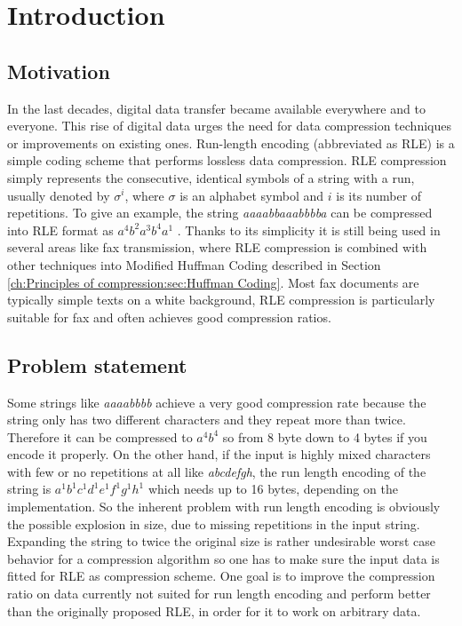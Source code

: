 
\chapter{Introduction}
\label{ch:Introduction}
\section{Motivation}
\label{ch:Introduction:sec:Motivation}
\par{
In the last decades, digital data transfer became available everywhere and to everyone. This rise of digital data urges the need for data compression techniques or improvements on existing ones. Run-length encoding \cite{rle-patent} (abbreviated as RLE) is a simple coding scheme that performs lossless data compression. RLE compression simply represents the consecutive, identical symbols of a string with a run, usually denoted by $\sigma^i$, where $\sigma$ is an alphabet symbol and $i$ is its number of repetitions. To give an example, the string \emph{aaaabbaaabbbba} can be compressed into RLE format as  $ a^{4}b^{2}a^{3}b^{4}a^{1}$ . Thanks to its simplicity it is still being used in several areas like fax transmission, where RLE compression is combined with other techniques into Modified Huffman Coding \cite{fax-rle} described in Section \ref{ch:Principles of compression:sec:Huffman Coding}. Most fax documents are typically simple texts on a white background, RLE compression is particularly suitable for fax and often achieves good compression ratios.
}
\section{Problem statement}
\label{ch:Introduction:sec:Problem statement}
\par{
Some strings like \emph{aaaabbbb} achieve a very good compression rate because the string only has two different characters and they repeat more than twice. Therefore it can be compressed to $a^4b^4$ so from 8 byte down to 4 bytes if you encode it properly. On the other hand, if the input is highly mixed characters with few or no repetitions at all like \emph{abcdefgh}, the run length encoding of the string is $a^1b^1c^1d^1e^1f^1g^1h^1$ which needs up to 16 bytes, depending on the implementation. So the inherent problem with run length encoding is obviously the possible explosion in size, due to missing repetitions in the input string. Expanding the string to twice the original size is rather undesirable worst case behavior for a compression algorithm so one has to make sure the input data is fitted for RLE as compression scheme. One goal is to improve the compression ratio on data currently not suited for run length encoding and perform better than the originally proposed RLE, in order for it to work on arbitrary data.}

